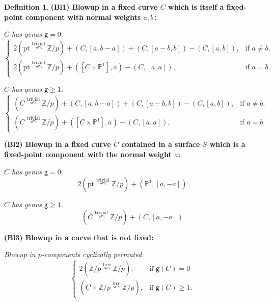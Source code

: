 \documentclass[12pt,a4paper]{amsart}
\theoremstyle{definition}
\newtheorem{definition}[theorem]{Definition}
\theoremstyle{remark}
\newcommand{\Z}{\mathbb{Z}}
\begin{document}
\begin{definition}
\noindent\textbf{(Bl1) Blowup in a fixed curve $C$ which is itself a fixed-point component with normal weights $a,b\,$:}
\begin{defsubenum}
    \item[(Bl1-0)] \emph{$C$ has genus $\mathsf g=0$.}
    \[
    \begin{cases}2(\mathrm{pt}\stackrel{\mathrm{trivial}}{\curvearrowleft} \Z/p )
    + (C,[a,b-a]) + (C,[a-b,b]) - (C,[a,b]), & \text{if } a \neq b, \\2(\mathrm{pt}\stackrel{\mathrm{trivial}}{\curvearrowleft} \Z/p )
    + ([C\times\mathbb{P}^1],a) - (C,[a,a]), & \text{if } a = b.
    \end{cases}
    \]
    \item[(Bl1-1)] \emph{$C$ has genus $\mathsf g\ge 1$.}
    \[
    \begin{cases}
    (C\stackrel{\mathrm{trivial}}{\curvearrowleft}\mathbb{Z}/p)
    + (C,[a,b-a]) + (C,[a-b,b]) - (C,[a,b]), & \text{if } a \neq b, \\
    (C\stackrel{\mathrm{trivial}}{\curvearrowleft}\mathbb{Z}/p)
    + ([C\times\mathbb{P}^1],a) - (C,[a,a]), & \text{if } a = b.
    \end{cases}
    \]
\end{defsubenum}


\noindent\textbf{(Bl2) Blowup in a fixed curve $C$  contained in a surface $S$ which is a fixed-point component with the normal weight $a$:}
\begin{defsubenum}
    \item[(Bl2-0)] \emph{$C$ has genus $\mathsf g=0$.}
    \[2(\mathrm{pt}\stackrel{\mathrm{trivial}}{\curvearrowleft}\mathbb{Z}/p) 
    + (\mathbb{P}^1,[a,-a])\]
\item[(Bl2-1)] \emph{$C$ has genus $\mathsf g\ge 1$.}
    \[   (C\stackrel{\mathrm{trivial}}{\curvearrowleft}\mathbb{Z}/p) + (C,[a,-a])
    \]
\end{defsubenum}

\noindent\textbf{(Bl3) Blowup in a curve that is not fixed:}
\begin{defsubenum}
    \item[(Bl3-a)] \emph{Blowup in $p$-components cyclically permuted.}
    \[
    \begin{cases}2 (\Z/p \stackrel{\mathrm{free}}{\curvearrowleft} \Z/p ), & \text{if } \mathsf{g}(C)=0\\
    (C\times \Z/p \stackrel{\mathrm{free}}{\curvearrowleft} \Z/p ), & \text{if } \mathsf{g}(C)\geq 1.
    \end{cases}
    \]
    

\end{defsubenum}
\end{definition}
\end{document}
